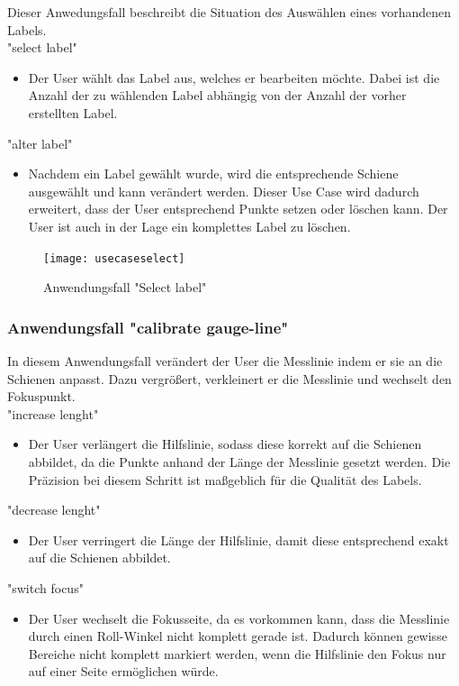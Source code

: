 \documentclass[11pt]{scrartcl}
\begin{document}
Dieser Anwedungsfall beschreibt die Situation des Auswählen eines vorhandenen Labels. 
\\

\noindent
"select label"
\begin{itemize}
	\item Der User wählt das Label aus, welches er bearbeiten möchte. Dabei ist die Anzahl der zu wählenden Label abhängig von der Anzahl der vorher erstellten Label.
\end{itemize}


"alter label"
\begin{itemize}
	\item Nachdem ein Label gewählt wurde, wird die entsprechende Schiene ausgewählt und kann verändert werden. Dieser Use Case wird dadurch erweitert, dass der User entsprechend Punkte setzen oder löschen  kann. Der User ist auch in der Lage ein komplettes Label zu löschen.
\end{itemize}


\begin{figure}[H]
  \texttt{[image: usecaseselect]}
  \caption{Anwendungsfall "Select label"}
\end{figure}


\subsubsection{Anwendungsfall "calibrate gauge-line"}
\label{sec:Anwendungsfall "calibrate helpbar" }

In diesem Anwendungsfall verändert der User die Messlinie indem er sie an die Schienen anpasst. Dazu vergrößert, verkleinert er die Messlinie und wechselt den Fokuspunkt.
\\

\noindent
"increase lenght"
\begin{itemize}
	\item Der User verlängert die Hilfslinie, sodass diese korrekt auf die Schienen abbildet, da die Punkte anhand der Länge der Messlinie gesetzt werden. Die Präzision bei diesem Schritt ist maßgeblich für die Qualität des Labels.
\end{itemize}

"decrease lenght"
\begin{itemize}
	\item Der User verringert die Länge der Hilfslinie, damit diese entsprechend exakt auf die Schienen abbildet. 
\end{itemize}

"switch focus"
\begin{itemize}
	\item Der User wechselt die Fokusseite, da es vorkommen kann, dass die Messlinie durch einen Roll-Winkel nicht komplett gerade ist. Dadurch können gewisse Bereiche nicht komplett markiert werden, wenn die Hilfslinie den Fokus nur auf einer Seite ermöglichen würde. 
\end{itemize}
\end{document}
